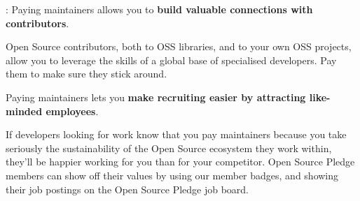 \begin{multicols}{2}
: Paying maintainers allows you to \textbf{build valuable connections with contributors}.

Open Source contributors, both to OSS libraries, and to your own OSS projects, allow you to leverage the skills of a
global base of specialised developers. Pay them to make sure they stick around.

 Paying maintainers lets you \textbf{make recruiting easier by attracting like-minded employees}.

If developers looking for work know that you pay maintainers because you take seriously the sustainability of the Open
Source ecosystem they work within, they'll be happier working for you than for your competitor. Open Source Pledge
members can show off their values by using our member badges, and showing their job postings on the Open Source
Pledge job board.


\end{multicols}


